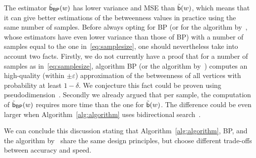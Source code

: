 %
%
%
%

The estimator $\tilde{\mathsf{b}}_{\mathsf{BP}}(w)$ has lower variance and MSE than
$\tilde{\mathsf{b}}(w)$, which means that it can give better estimations of the
betweenness values in practice using the same number of samples. Before always
opting for \textsf{BP} (or for the algorithm by~\citet{GeisbergerSS08}, whose
estimators have even lower variance than those of \textsf{BP}) with a number of
samples equal to the one in~\eqref{eq:samplesize}, one should
nevertheless take into account two facts. Firstly, we do not currently have a
proof that for a number of samples as in~\eqref{eq:samplesize}, algorithm
\textsf{BP} (or the algorithm by~\citet{GeisbergerSS08}) computes an
high-quality (within $\pm\varepsilon$) approximation of the betweenness of all
vertices with probability at least $1-\delta$. We conjecture this fact could be
proven using pseudodimension~\citep[Chap.~11]{AnthonyB99}. Secondly we already
argued that per sample, the computation of $\tilde{\mathsf{b}}_{\mathsf{BP}}(w)$
requires more time than the one for $\tilde{\mathsf{b}}(w)$. The
difference could be even larger when Algorithm~\ref{alg:algorithm} uses
bidirectional search~\citep{KaindlK97,Pohl69}. 

We can conclude this discussion stating that Algorithm~\ref{alg:algorithm},
\textsf{BP}, and the algorithm by~\citet{GeisbergerSS08} share the same design
principles, but choose different trade-offs between accuracy and speed.  
\fi

